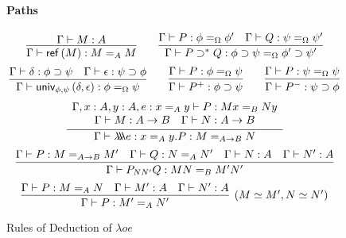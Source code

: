 \begin{figure}
\begin{framed}
\paragraph{Paths}
\[ \infer{\Gamma \vdash \reff{M} : M =_A M}{\Gamma \vdash M : A}
\qquad
\infer{\Gamma \vdash P \supset^* Q : \phi \supset \psi =_\Omega \phi' \supset \psi'}{\Gamma \vdash P : \phi =_\Omega \phi' \quad \Gamma \vdash Q : \psi =_\Omega \psi'} \]
\[ \infer{\Gamma \vdash \univ{\phi}{\psi}{\delta}{\epsilon} : \phi =_\Omega \psi}{\Gamma \vdash \delta : \phi \supset \psi \quad \Gamma \vdash \epsilon : \psi \supset \phi} 
\qquad
\infer{\Gamma \vdash P^+ : \phi \supset \psi}{\Gamma \vdash P : \phi =_\Omega \psi}
\qquad
\infer{\Gamma \vdash P^- : \psi \supset \phi}{\Gamma \vdash P : \psi =_\Omega \psi} \]
\[ \infer{\Gamma \vdash \triplelambda e : x =_A y . P : M =_{A \rightarrow B} N}
  {\begin{array}{c}
     \Gamma, x : A, y : A, e : x =_A y \vdash P : M x =_B N y \\
     \Gamma \vdash M : A \rightarrow B \quad
\Gamma \vdash N : A \rightarrow B
     \end{array}} \]
\[ \infer{\Gamma \vdash P_{NN'}Q : MN =_B M' N'}{\Gamma \vdash P : M =_{A \rightarrow B} M' \quad \Gamma \vdash Q : N =_A N' \quad \Gamma \vdash N : A \quad \Gamma \vdash N' : A} \]
\[ \infer[(M \simeq M', N \simeq N')]{\Gamma \vdash P : M' =_A N'}{\Gamma \vdash P : M =_A N \quad \Gamma \vdash M' : A \quad \Gamma \vdash N' : A} \]
\end{framed}
\caption{Rules of Deduction of $\lambda oe$}
\label{fig:lambdao}
\end{figure}

